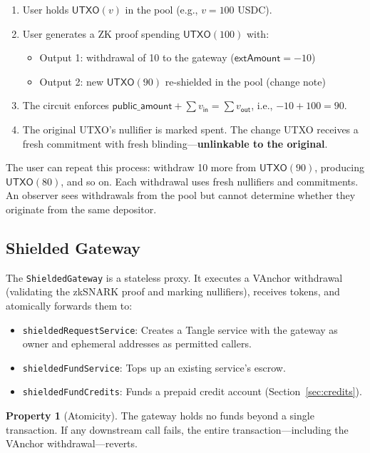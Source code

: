 \documentclass[11pt,a4paper]{article}
\theoremstyle{definition}
\newtheorem{property}{Property}
\begin{document}
\begin{enumerate}[nosep]
  \item User holds $\mathsf{UTXO}(v)$ in the pool (e.g., $v = 100$ USDC).
  \item User generates a ZK proof spending $\mathsf{UTXO}(100)$ with:
  \begin{itemize}[nosep]
    \item Output 1: withdrawal of 10 to the gateway ($\mathsf{extAmount} = -10$)
    \item Output 2: new $\mathsf{UTXO}(90)$ re-shielded in the pool (change note)
  \end{itemize}
  \item The circuit enforces $\mathsf{public\_amount} + \sum v_{\mathsf{in}} = \sum v_{\mathsf{out}}$, i.e., $-10 + 100 = 90$.
  \item The original UTXO's nullifier is marked spent. The change UTXO receives a fresh commitment with fresh blinding---\textbf{unlinkable to the original}.
\end{enumerate}

The user can repeat this process: withdraw 10 more from $\mathsf{UTXO}(90)$, producing $\mathsf{UTXO}(80)$, and so on. Each withdrawal uses fresh nullifiers and commitments. An observer sees withdrawals from the pool but cannot determine whether they originate from the same depositor.

\subsection{Shielded Gateway}

The \texttt{ShieldedGateway} is a stateless proxy. It executes a VAnchor withdrawal (validating the zkSNARK proof and marking nullifiers), receives tokens, and atomically forwards them to:

\begin{itemize}[nosep]
  \item \texttt{shieldedRequestService}: Creates a Tangle service with the gateway as owner and ephemeral addresses as permitted callers.
  \item \texttt{shieldedFundService}: Tops up an existing service's escrow.
  \item \texttt{shieldedFundCredits}: Funds a prepaid credit account (Section~\ref{sec:credits}).
\end{itemize}

\begin{property}[Atomicity]
The gateway holds no funds beyond a single transaction. If any downstream call fails, the entire transaction---including the VAnchor withdrawal---reverts.
\end{property}
\end{document}
